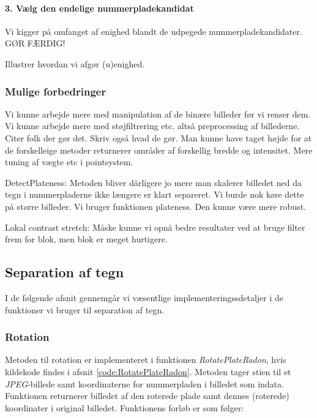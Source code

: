 \paragraph{3. Vælg den endelige nummerpladekandidat}
Vi kigger på omfanget af enighed blandt de udpegede nummerpladekandidater. GØR FÆRDIG! 


  


Illustrer hvordan vi afgør (u)enighed. 

\subsubsection{Mulige forbedringer}
Vi kunne arbejde mere med manipulation af de binære billeder før vi renser dem. Vi kunne arbejde mere med støjfiltrering etc. altså preprocessing af billederne. Citer folk der gør det. Skriv også hvad de gør.
Man kunne have taget højde for at de forskelleige metoder returnerer områder af forskellig bredde og intensitet.
Mere tuning af vægte etc i pointsystem.

DetectPlateness:
Metoden bliver dårligere jo mere man skalerer billedet ned da tegn i nummerpladerne ikke længere er klart separeret. Vi burde nok køre dette på større billeder.
Vi bruger funktionen plateness. Den kunne være mere robust.

Lokal contrast stretch:
Måske kunne vi opnå bedre resultater ved at bruge filter frem for blok, men blok er meget hurtigere.



\subsection{Separation af tegn}

I de følgende afsnit gennemgår vi væsentlige implementeringssdetaljer i de funktioner vi bruger til separation af tegn. 

\subsubsection{Rotation}
\label{sec:implementation/sep/rotation}

Metoden til rotation er implementeret i funktionen \textit{RotatePlateRadon}, hvis kildekode findes i afsnit \vref{code:RotatePlateRadon}. Metoden tager stien til et \textit{JPEG}-billede samt koordinaterne for nummerpladen i billedet som indata. Funktionen returnerer billedet af den roterede plade samt dennes (roterede) koordinater i original billedet. Funktionens forløb er som følger:

